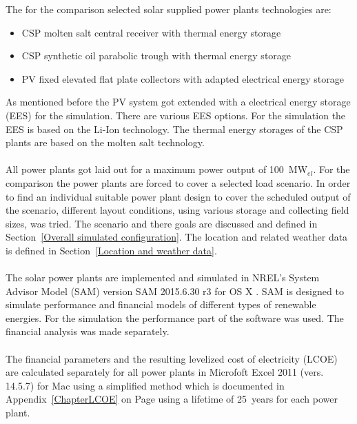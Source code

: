 \documentclass[Master,MEE,english]{twbook}%
\begin{document}
The for the comparison selected solar supplied power plants technologies are: 
\begin{itemize}
\item CSP molten salt central receiver with thermal energy storage
\item CSP synthetic oil parabolic trough with thermal energy storage
\item PV fixed elevated flat plate collectors with adapted electrical energy storage
\end{itemize}
As mentioned before the PV system got extended with a electrical energy storage (EES) for the simulation. There are various EES options. For the simulation the EES is based on the Li-Ion technology. The thermal energy storages of the CSP plants are based on the molten salt technology.\\
\\
All power plants got laid out for a maximum power output of 100~MW$_{el}$. For the comparison the power plants are forced to cover a selected load scenario. In order to find an individual suitable power plant design to cover the scheduled output of the scenario, different layout conditions, using various storage and collecting field sizes, was tried. The scenario and there goals are discussed and defined in Section~\ref{Overall simulated configuration}. The location and related weather data is defined in Section~\ref{Location and weather data}.\\
\\
The solar power plants are implemented and simulated in NREL’s System Advisor Model (SAM) version SAM 2015.6.30 r3 for OS X \cite{NREL2015}. SAM is designed to simulate performance and financial models of different types of renewable energies. For the simulation the performance part of the software was used. The financial analysis was made separately. \\
\\
The financial parameters and the resulting levelized cost of electricity (LCOE) are calculated separately  for all power plants in Microfoft Excel 2011 (vers. 14.5.7) for Mac using a simplified method which is documented in Appendix~\ref{ChapterLCOE} on Page \pageref{ChapterLCOE} using a lifetime of 25~years for each power plant.
\end{document}
